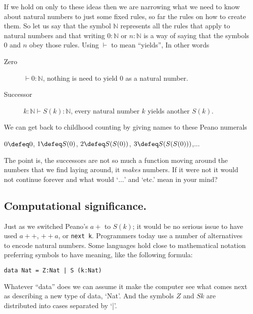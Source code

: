 If we hold on only to these ideas then we are narrowing what we need 
to know about natural numbers to just some fixed rules, so far the rules 
on how to create them.  So let us say that the symbol $\mathbb{N}$ represents 
all the rules that apply to natural numbers and that writing $0:\mathbb{N}$ or 
$n:\mathbb{N}$ is a way of saying that the symbols $0$ and $n$ obey those rules.
Using $\vdash$ to mean  ``yields'', 
In other words
\begin{description}
    \item[Zero] $\vdash 0: \mathbb{N}$, nothing is need to  yield $0$ as a natural number.
    \item[Successor] $k:\mathbb{N}\vdash S(k):\mathbb{N}$, every natural number  $k$ yields 
    another $S(k)$.
\end{description}
We can get back to childhood 
counting by giving names to these Peano numerals
\begin{center}
    $0\defeq 0$,
    $1\defeq S(0)$,
    $2\defeq S(S(0))$,
    $3\defeq S(S(S(0)))$,...
\end{center}
The point is, the successors are not so much a function 
moving around the numbers that we find laying around, it
\emph{makes} numbers.  
If it were not it would not continue forever 
and what would `$\ldots$' and `etc.' mean in your mind?

\subsection{Computational significance.}
Just as we switched Peano's $a+$ to $S(k)$;
it would be no serious issue to have used $a++$, $++a$, or \lstinline{next k}.
Programmers today use a number of alternatives to encode natural 
numbers.  Some languages hold close to mathematical notation 
preferring symbols to have meaning, like the following formula:
\begin{center}
\begin{lstlisting}[language=Hidris]
    data Nat = Z:Nat | S (k:Nat)
\end{lstlisting}
\end{center}
Whatever ``data'' does we can assume it make the computer see what comes 
next as describing a new type of data, `Nat'.  And the symbols 
$Z$ and $S k$ are distributed into cases separated by `|'.


